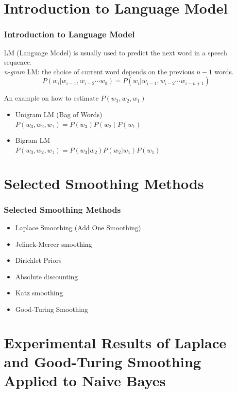 \documentclass{beamer}
\begin{document}
\section{Introduction to Language Model}
\begin{frame}
\frametitle{Introduction to Language Model}
LM (Language Model) is usually used to predict the next word in a speech sequence.\\
\textit{n-gram} LM: the choice of current word depends on the previous $n-1$ words.
\begin{equation*}
    P(w_{i} | w_{i-1}, w_{i-2} \cdots w_{0}) = P(w_{i} | w_{i-1}, w_{i-2} \cdots w_{i-n+1})
\end{equation*}

An example on how to estimate $P(w_{3}, w_{2}, w_{1})$
\begin{itemize}
  \item Unigram LM (Bag of Words)\\
        $P(w_{3}, w_{2}, w_{1})= P(w_{3})P(w_{2})P(w_{1})$
  \item Bigram LM\\
        $P(w_{3}, w_{2}, w_{1})=P(w_{3}|w_{2})P(w_{2}|w_{1})P(w_{1})$
\end{itemize}

\end{frame}

\section{Selected Smoothing Methods}
\begin{frame}
\frametitle{Selected Smoothing Methods}
\begin{itemize}
  \item Laplace Smoothing (Add One Smoothing)
  \item Jelinek-Mercer smoothing
  \item Dirichlet Priors
  \item Absolute discounting
  \item Katz smoothing
  \item Good-Turing Smoothing
\end{itemize}
\end{frame}

\section{Experimental Results of Laplace and Good-Turing Smoothing Applied to Naive Bayes}
\begin{frame}
\end{frame}
\end{document}
